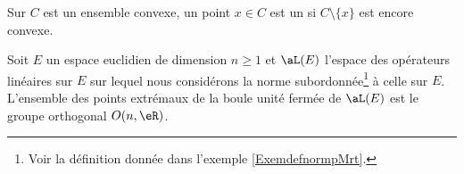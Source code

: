 \begin{definition}
    Sur \( C\) est un ensemble convexe, un point \( x\in C\) est un  si \( C\setminus\{ x \}\) est encore convexe.
\end{definition}

\begin{theorem} \label{ThoBALmoQw}
    Soit \( E\) un espace euclidien de dimension \( n\geq 1\) et \( \aL(E)\) l'espace des opérateurs linéaires sur \( E\) sur lequel nous considérons la norme subordonnée\footnote{Voir la définition donnée dans l'exemple \ref{ExemdefnormpMrt}.} à celle sur \( E\). L'ensemble des points extrémaux de la boule unité fermée de \( \aL(E)\) est le groupe orthogonal \( O(n,\eR)\).
\end{theorem}

